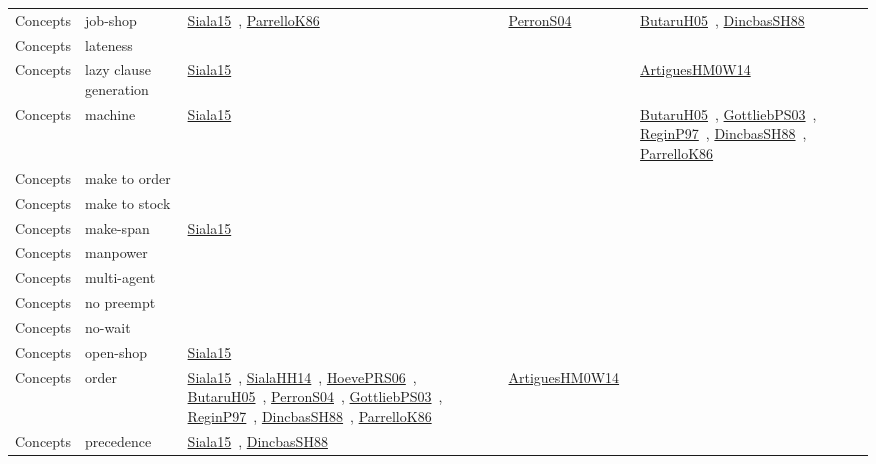 {\begin{longtable}{lp{3cm}>{\raggedright\arraybackslash}p{6cm}>{\raggedright\arraybackslash}p{6cm}>{\raggedright\arraybackslash}p{8cm}}
Concepts & job-shop & \href{cars/works/Siala15.pdf}{Siala15}~\cite{Siala15}, \href{cars/works/ParrelloK86.pdf}{ParrelloK86}~\cite{ParrelloK86} & \href{cars/works/PerronS04.pdf}{PerronS04}~\cite{PerronS04} & \href{cars/works/ButaruH05.pdf}{ButaruH05}~\cite{ButaruH05}, \href{cars/works/DincbasSH88.pdf}{DincbasSH88}~\cite{DincbasSH88}\\
Concepts & lateness &  &  & \\
Concepts & lazy clause generation & \href{cars/works/Siala15.pdf}{Siala15}~\cite{Siala15} &  & \href{cars/works/ArtiguesHM0W14.pdf}{ArtiguesHM0W14}~\cite{ArtiguesHM0W14}\\
Concepts & machine & \href{cars/works/Siala15.pdf}{Siala15}~\cite{Siala15} &  & \href{cars/works/ButaruH05.pdf}{ButaruH05}~\cite{ButaruH05}, \href{cars/works/GottliebPS03.pdf}{GottliebPS03}~\cite{GottliebPS03}, \href{cars/works/ReginP97.pdf}{ReginP97}~\cite{ReginP97}, \href{cars/works/DincbasSH88.pdf}{DincbasSH88}~\cite{DincbasSH88}, \href{cars/works/ParrelloK86.pdf}{ParrelloK86}~\cite{ParrelloK86}\\
Concepts & make to order &  &  & \\
Concepts & make to stock &  &  & \\
Concepts & make-span & \href{cars/works/Siala15.pdf}{Siala15}~\cite{Siala15} &  & \\
Concepts & manpower &  &  & \\
Concepts & multi-agent &  &  & \\
Concepts & no preempt &  &  & \\
Concepts & no-wait &  &  & \\
Concepts & open-shop & \href{cars/works/Siala15.pdf}{Siala15}~\cite{Siala15} &  & \\
Concepts & order & \href{cars/works/Siala15.pdf}{Siala15}~\cite{Siala15}, \href{cars/works/SialaHH14.pdf}{SialaHH14}~\cite{SialaHH14}, \href{cars/works/HoevePRS06.pdf}{HoevePRS06}~\cite{HoevePRS06}, \href{cars/works/ButaruH05.pdf}{ButaruH05}~\cite{ButaruH05}, \href{cars/works/PerronS04.pdf}{PerronS04}~\cite{PerronS04}, \href{cars/works/GottliebPS03.pdf}{GottliebPS03}~\cite{GottliebPS03}, \href{cars/works/ReginP97.pdf}{ReginP97}~\cite{ReginP97}, \href{cars/works/DincbasSH88.pdf}{DincbasSH88}~\cite{DincbasSH88}, \href{cars/works/ParrelloK86.pdf}{ParrelloK86}~\cite{ParrelloK86} & \href{cars/works/ArtiguesHM0W14.pdf}{ArtiguesHM0W14}~\cite{ArtiguesHM0W14} & \\
Concepts & precedence & \href{cars/works/Siala15.pdf}{Siala15}~\cite{Siala15}, \href{cars/works/DincbasSH88.pdf}{DincbasSH88}~\cite{DincbasSH88} &  & \\

\end{longtable}}
